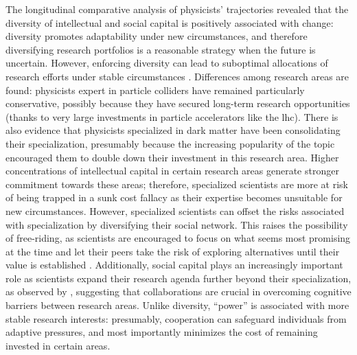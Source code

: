\documentclass{article}
\begin{document}
The longitudinal comparative analysis of physicists' trajectories revealed that the diversity of intellectual and social capital is positively associated with change: diversity promotes adaptability under new circumstances, and therefore diversifying research portfolios is a reasonable strategy when the future is uncertain. However, enforcing diversity can lead to suboptimal allocations of research efforts under stable circumstances \citep{Schimmelpfennig2021}. Differences among research areas are found: physicists expert in particle colliders have remained particularly conservative, possibly because they have secured long-term research opportunities (thanks to very large investments in particle accelerators like the \gls{lhc}). There is also evidence that physicists specialized in dark matter have been consolidating their specialization, presumably because the increasing popularity of the topic encouraged them to double down their investment in this research area. Higher concentrations of intellectual capital in certain research areas generate stronger commitment towards these areas; therefore, specialized scientists are more at risk of being trapped in a sunk cost fallacy as their expertise becomes unsuitable for new circumstances. However, specialized scientists can offset the risks associated with specialization by diversifying their social network. This raises the possibility of free-riding, as scientists are encouraged to focus on what seems most promising at the time and let their peers take the risk of exploring alternatives until their value is established \citep{Kummerfeld2016}. Additionally, social capital plays an increasingly important role as scientists expand their research agenda further beyond their specialization, as observed by \citealt{Tripodi2020}, suggesting that collaborations are crucial in overcoming cognitive barriers between research areas. Unlike diversity, ``power'' is associated with more stable research interests: presumably, cooperation can safeguard individuals from adaptive pressures, and most importantly minimizes the cost of remaining invested in certain areas. %

\end{document}
